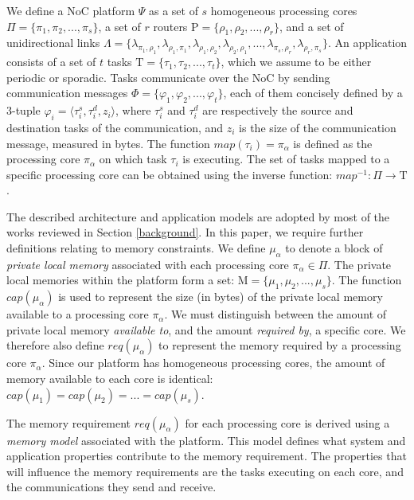 \documentclass[conference]{IEEEtran}
\begin{document}
We define a NoC platform $\Psi$ as a set of $s$ homogeneous processing cores $\Pi = \lbrace \pi_1, \pi_2, ..., \pi_s \rbrace$, a set of $r$ routers $\mathrm{P} = \lbrace \rho_1, \rho_2, ..., \rho_r \rbrace$, and a set of unidirectional links $\Lambda = \lbrace \lambda_{\pi_1,\rho_1}, \lambda_{\rho_1,\pi_1}, \lambda_{\rho_1,\rho_2}, \lambda_{\rho_2,\rho_1}, ..., \lambda_{\pi_s,\rho_r}, \lambda_{\rho_r,\pi_s} \rbrace$. An application consists of a set of $t$ tasks $\mathrm{T} = \lbrace \tau_1, \tau_2, ..., \tau_t \rbrace$, which we assume to be either periodic or sporadic. Tasks communicate over the NoC by sending communication messages $\Phi  = \lbrace \varphi_1, \varphi_2, ..., \varphi_t \rbrace$, each of them concisely defined by a 3-tuple $\varphi_i = \langle \tau^s_i, \tau^d_i, z_i \rangle$, where $\tau^s_i$ and $\tau^d_i$ are respectively the source and destination tasks of the communication, and $z_i$ is the size of the communication message, measured in bytes. The function $map(\tau_i) = \pi_\alpha$ is defined as the processing core $\pi_\alpha$ on which task $\tau_i$ is executing. The set of tasks mapped to a specific processing core can be obtained using the inverse function: $map^{-1}:\Pi \rightarrow \mathrm{T}$.

The described architecture and application models are adopted by most of the works reviewed in Section \ref{background}. In this paper, we require further definitions relating to memory constraints. We define $\mu_\alpha$ to denote a block of \textit{private local memory} associated with each processing core $\pi_\alpha \in \Pi$. The private local memories within the platform form a set: $\mathrm{M} = \lbrace \mu_1, \mu_2, ..., \mu_s \rbrace$. The function $cap(\mu_\alpha)$ is used to represent the size (in bytes) of the private local memory available to a processing core $\pi_\alpha$. We must distinguish between the amount of private local memory \textit{available to}, and the amount \textit{required by}, a specific core. We therefore also define $req(\mu_\alpha)$ to represent the memory required by a processing core $\pi_\alpha$. Since our platform has homogeneous processing cores, the amount of memory available to each core is identical: $cap(\mu_1) = cap(\mu_2) = ... = cap(\mu_s)$.

The memory requirement $req(\mu_\alpha)$ for each processing core is derived using a \textit{memory model} associated with the platform. This model defines what system and application properties contribute to the memory requirement. The properties that will influence the memory requirements are the tasks executing on each core, and the communications they send and receive. 
\end{document}
